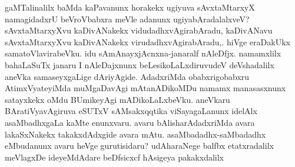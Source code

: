 gaMTalinalilx baMda kaPavanunx horakekx ugiyuva sAvxtaMtarxyX namagidadxrU beVroVbabxra meVle adanunx ugiyabAradalalxveV? sAvxtaMtarxyXvu kaDivANakekx vidudadhxvAgirabAradu, kaDivANavu sAvxtaMtarxyXvu kaDivANakekx virudadhxvAgirabAradu,. hiVge eraDakUkx sa\-matoVlavirabeVku. idu sAmAnayxjAcnxna-janaralf nAleDfjx. namamxlilx bahaLaSuTx janaru I nAleDajxnunx beLesikoLaLxdiruvudeV deVshadalilx aneVka samaseyxgaLige dAriyAgide. AdadxriMda obabxrigobabxru AtimxVyateyiMda muMgaDavAgi mAtanADikoMDu namamx manasasxnunx satayxkekx oMdu BUmikeyAgi mADikoLaLxbeVku. aneVkaru BAratiVyavAgiruva eSUTxV sAMsakxqqtika viSayagaLanunx idelAlx asaMbadhxgaLa kaMte enunxvaru. avaru bA\-lisharAdadxriMda avara lakaSxNakekx takakxdAdxgide avara mAtu. asaMbadadhx-saMbadadhx eMbudanunx avaru heVge gurutisidaru? udAharaNege balfbx etatxradalilx meVlagxDe ideyeMdAdare beDfsicxcf hAsigeya pakakxdalilx 
